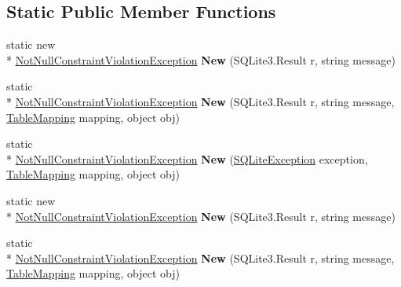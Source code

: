 \subsection*{Static Public Member Functions}
\begin{DoxyCompactItemize}
\item 
\hypertarget{classSQLite_1_1NotNullConstraintViolationException_a7989030e3242311aaca6b3d184184396}{static new \\*
\hyperlink{classSQLite_1_1NotNullConstraintViolationException}{Not\-Null\-Constraint\-Violation\-Exception} {\bfseries New} (S\-Q\-Lite3.\-Result r, string message)}\label{classSQLite_1_1NotNullConstraintViolationException_a7989030e3242311aaca6b3d184184396}

\item 
\hypertarget{classSQLite_1_1NotNullConstraintViolationException_ac25b33dde04a9b12bd6984038e4b2972}{static \\*
\hyperlink{classSQLite_1_1NotNullConstraintViolationException}{Not\-Null\-Constraint\-Violation\-Exception} {\bfseries New} (S\-Q\-Lite3.\-Result r, string message, \hyperlink{classSQLite_1_1TableMapping}{Table\-Mapping} mapping, object obj)}\label{classSQLite_1_1NotNullConstraintViolationException_ac25b33dde04a9b12bd6984038e4b2972}

\item 
\hypertarget{classSQLite_1_1NotNullConstraintViolationException_a25c290bafcea136ebd06b2959bf20c3c}{static \\*
\hyperlink{classSQLite_1_1NotNullConstraintViolationException}{Not\-Null\-Constraint\-Violation\-Exception} {\bfseries New} (\hyperlink{classSQLite_1_1SQLiteException}{S\-Q\-Lite\-Exception} exception, \hyperlink{classSQLite_1_1TableMapping}{Table\-Mapping} mapping, object obj)}\label{classSQLite_1_1NotNullConstraintViolationException_a25c290bafcea136ebd06b2959bf20c3c}

\item 
\hypertarget{classSQLite_1_1NotNullConstraintViolationException_a7989030e3242311aaca6b3d184184396}{static new \\*
\hyperlink{classSQLite_1_1NotNullConstraintViolationException}{Not\-Null\-Constraint\-Violation\-Exception} {\bfseries New} (S\-Q\-Lite3.\-Result r, string message)}\label{classSQLite_1_1NotNullConstraintViolationException_a7989030e3242311aaca6b3d184184396}

\item 
\hypertarget{classSQLite_1_1NotNullConstraintViolationException_ac25b33dde04a9b12bd6984038e4b2972}{static \\*
\hyperlink{classSQLite_1_1NotNullConstraintViolationException}{Not\-Null\-Constraint\-Violation\-Exception} {\bfseries New} (S\-Q\-Lite3.\-Result r, string message, \hyperlink{classSQLite_1_1TableMapping}{Table\-Mapping} mapping, object obj)}\label{classSQLite_1_1NotNullConstraintViolationException_ac25b33dde04a9b12bd6984038e4b2972}


\end{DoxyCompactItemize}
